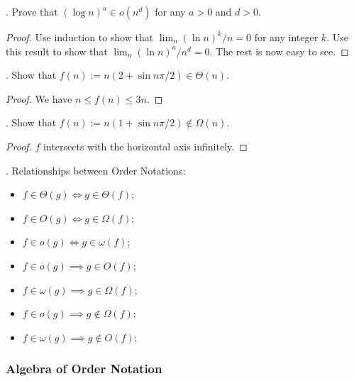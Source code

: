 \documentclass{article}
\begin{document}
\begin{examplee}[].
    Prove that $(\log n)^a \in o(n^d)$ for any $a > 0$ and $d > 0$. 

    \begin{proof}
        Use induction to show that $\lim_n (\ln n)^k / n = 0$ for any integer $k$. Use this result to show that $\lim_n (\ln n)^a / n^d = 0$. The rest is now easy to see. 
    \end{proof}
\end{examplee}

\begin{examplee}[]. 
    Show that $f(n) := n(2 + \sin n\pi / 2) \in \Theta(n)$. 

    \begin{proof}
        We have $n \leq f(n) \leq 3n$. 
    \end{proof}
\end{examplee}

\begin{examplee}[].
    Show that $f(n) := n(1 + \sin n\pi / 2) \notin \Omega(n)$. 

    \begin{proof}
        $f$ intersects with the horizontal axis infinitely. 
    \end{proof}
\end{examplee}

\begin{result}[].
    Relationships between Order Notations: 
    \begin{itemize}
        \item $f \in \Theta(g) \iff g \in \Theta(f)$; 
        \item $f \in O(g) \iff g \in \Omega(f)$; 
        \item $f \in o(g) \iff g \in \omega(f)$; 
        \item $f \in o(g) \implies g \in O(f)$; 
        \item $f \in \omega(g) \implies g \in \Omega(f)$; 
        \item $f \in o(g) \implies g \notin \Omega(f)$; 
        \item $f \in \omega(g) \implies g \notin O(f)$; 
    \end{itemize}
\end{result} 

\subsubsection{Algebra of Order Notation}
\end{document}
